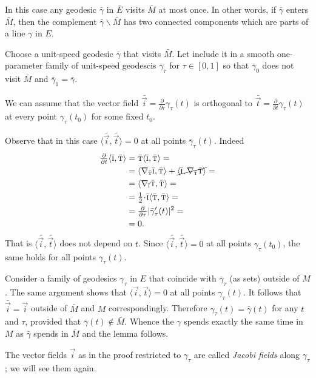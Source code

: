 In this case any geodesic $\bar\gamma$ in $\bar E$ visits $\bar M$ at most once.
In other words, if $\bar\gamma$ enters $\bar M$, then the complement $\bar\gamma\backslash \bar M$ has two connected components which are parts of a line $\gamma$ in $E$.

Choose a unit-speed geodesic $\bar\gamma$ that visits $\bar M$.
Let include it in a smooth one-parameter family of unit-speed geodescis $\bar\gamma_\tau$ for $\tau\in [0,1]$ so that $\bar\gamma_0$ does not visit $\bar M$ and $\bar \gamma_1=\bar \gamma$.

We can assume that 
the vector field $\bar{\vec i}
=\tfrac{\partial}{\partial\tau}\gamma_\tau(t)$ is orthogonal to $\bar{\vec t}
=\tfrac{\partial}{\partial t}\gamma_\tau(t)$ at every point $\gamma_\tau(t_0)$ for some fixed $t_0$.

Observe that in this case $\langle\bar{\vec i},\bar{\vec t}\rangle=0$ at all points $\bar\gamma_\tau(t)$.
Indeed 
\begin{align*}
\tfrac{\partial}{\partial t}\langle\bar{\vec i},\bar{\vec t}\rangle&=
\bar{\vec t}\langle\bar{\vec i},\bar{\vec t}\rangle=
\\
&=
\langle\nabla_{\bar{\vec t}}\bar{\vec i},\bar{\vec t}\rangle+\cancel{\langle\bar{\vec i},\nabla_{\bar{\vec t}}\bar{\vec t}\rangle}=
\\
&=\langle\nabla_{\bar{\vec i}}\bar{\vec t},\bar{\vec t}\rangle=
\\
&=\tfrac12\cdot\bar{\vec i}\langle\bar{\vec t},\bar{\vec t}\rangle=
\\
&=\tfrac{\partial}{\partial \tau}|\bar\gamma_\tau'(t)|^2=
\\
&=0.
\end{align*}
That is $\langle\bar{\vec i},\bar{\vec t}\rangle$ does not depend on $t$.
Since $\langle\bar{\vec i},\bar{\vec t}\rangle=0$ at all points $\gamma_\tau(t_0)$, the same holds for all points  $\gamma_\tau(t)$.

Consider a family of geodesics $\gamma_\tau$ in $E$ that coincide with $\bar\gamma_\tau$ (as sets) outside of $M$.
The same argument shows that $\langle\vec i,\vec t\rangle=0$ at all points $\gamma_\tau(t)$.
It follows that $\bar{\vec i}=\vec i$ outside of $\bar M$ and $M$ correspondingly.
Therefore $\gamma_\tau(t)=\bar\gamma(t)$ for any $t$ and $\tau$, provided that $\bar\gamma(t)\notin \bar M$.
Whence the $\gamma$ spends exactly the same time in $M$ as 
$\bar \gamma$ spends in $\bar M$ and the lemma follows.\qeds

 The vector fields $\vec i$  as in the proof restricted to $\gamma_\tau$ are called \emph{Jacobi fields} along $\gamma_\tau$;
we will see them again.

